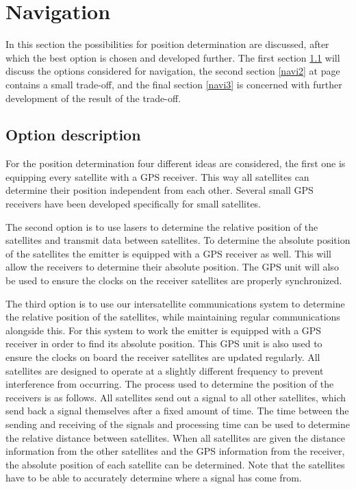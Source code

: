 \section{Navigation}
\label{NaviEmitter}
In this section the possibilities for position determination are discussed, after which the best option is chosen and developed further. The first section \ref{navi1} will discuss the options considered for navigation, the second section \ref{navi2} at page contains a small trade-off, and the final section \ref{navi3} is concerned with further development of the result of the trade-off.

\subsection{Option description}
\label{navi1}
For the position determination four different ideas are considered, the first one is equipping every satellite with a \acs{GPS} receiver. This way all satellites can determine their position independent from each other. Several small \acs{GPS} receivers have been developed specifically for small satellites.

The second option is to use lasers to determine the relative position of the satellites and transmit data between satellites. To determine the absolute position of the satellites the emitter is equipped with a \acs{GPS} receiver as well. This will allow the receivers to determine their absolute position. The \acs{GPS} unit will also be used to ensure the clocks on the receiver satellites are properly synchronized.

The third option is to use our intersatellite communications system to determine the relative position of the satellites, while maintaining regular communications alongside this. For this system to work the emitter is equipped with a GPS receiver in order to find its absolute position. This GPS unit is also used to ensure the clocks on board the receiver satellites are updated regularly. All satellites are designed to operate at a slightly different frequency to prevent interference from occurring. 
The process used to determine the position of the receivers is as follows. All satellites send out a signal to all other satellites, which send back a signal themselves after a fixed amount of time. The time between the sending and receiving of the signals and processing time can be used to determine the relative distance between satellites. When all satellites are given the distance information from the other satellites and the GPS information from the receiver, the absolute position of each satellite can be determined. Note that the satellites have to be able to accurately determine where a signal has come from.

